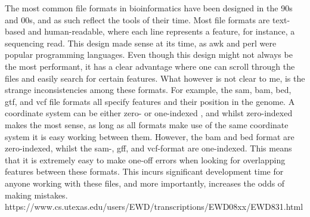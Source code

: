 The most common file formats in bioinformatics have been designed in the 90s and 00s, and as such reflect the tools of their time. Most file formats are text-based and human-readable, where each line represents a feature, for instance, a sequencing read. This design made sense at its time, as awk and perl were popular programming languages. Even though this design might not always be the most performant, it has a clear advantage where one can scroll through the files and easily search for certain features. What however is not clear to me, is the strange inconsistencies among these formats. For example, the sam, bam, bed, gtf, and vcf file formats all specify features and their position in the genome. A coordinate system can be either zero- or one-indexed , and whilst zero-indexed makes the most sense, as long as all formats make use of the same coordinate system it is easy working between them. However, the bam and bed format are zero-indexed\cite{Li2009}, whilst the sam-, gff, and vcf-format are one-indexed\cite{Li2009,Danecek2011}. This means that it is extremely easy to make one-off errors when looking for overlapping features between these formats. This incurs significant development time for anyone working with these files, and more importantly, increases the odds of making mistakes. 
https://www.cs.utexas.edu/users/EWD/transcriptions/EWD08xx/EWD831.html


